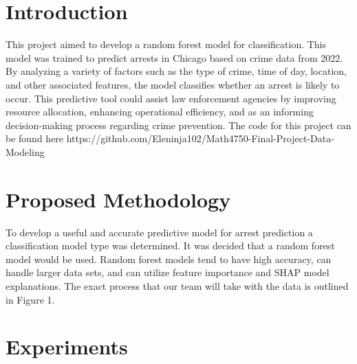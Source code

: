 \documentclass[conference]{IEEEtran}
\begin{document}
\section{Introduction}
This project aimed to develop a random forest model for classification. This model was trained to predict arrests in Chicago based on crime data from 2022. By analyzing a variety of factors such as the type of crime, time of day, location, and other associated features, the model classifies whether an arrest is likely to occur. This predictive tool could assist law enforcement agencies by improving resource allocation, enhancing operational efficiency, and as an informing decision-making process regarding crime prevention. The code for this project can be found here https://github.com/Eleninja102/Math4750-Final-Project-Data-Modeling

\section{Proposed Methodology}
To develop a useful and accurate predictive model for arrest prediction a classification model type was determined. It was decided that a random forest model would be used. Random forest models tend to have high accuracy, can handle larger data sets, and can utilize feature importance and SHAP model explanations. The exact process that our team will take with the data is outlined in Figure 1.


\section{Experiments}
\end{document}
